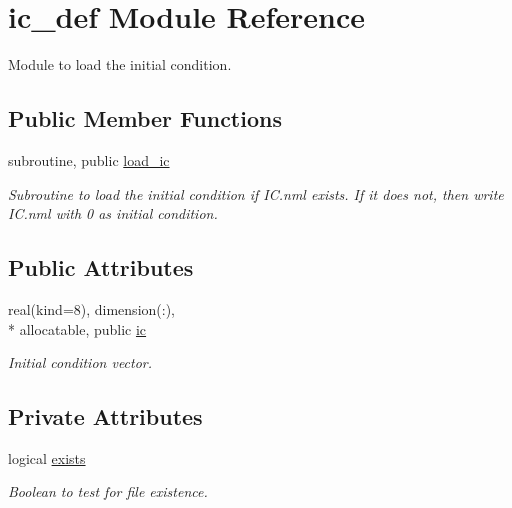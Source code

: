 \hypertarget{classic__def}{\section{ic\-\_\-def Module Reference}
\label{classic__def}
}


Module to load the initial condition.  


\subsection*{Public Member Functions}
\begin{DoxyCompactItemize}
\item 
subroutine, public \hyperlink{classic__def_af3d9de16d535e27cf3bacd7f82d68d54}{load\-\_\-ic}
\begin{DoxyCompactList}\small\item\em Subroutine to load the initial condition if I\-C.\-nml exists. If it does not, then write I\-C.\-nml with 0 as initial condition. \end{DoxyCompactList}\end{DoxyCompactItemize}
\subsection*{Public Attributes}
\begin{DoxyCompactItemize}
\item 
real(kind=8), dimension(\-:), \\*
allocatable, public \hyperlink{classic__def_abef3b68b2ee81311ed2c796cba3a382f}{ic}
\begin{DoxyCompactList}\small\item\em Initial condition vector. \end{DoxyCompactList}\end{DoxyCompactItemize}
\subsection*{Private Attributes}
\begin{DoxyCompactItemize}
\item 
logical \hyperlink{classic__def_a989b031664e87b1a693a329ecd4f4721}{exists}
\begin{DoxyCompactList}\small\item\em Boolean to test for file existence. \end{DoxyCompactList}\end{DoxyCompactItemize}


